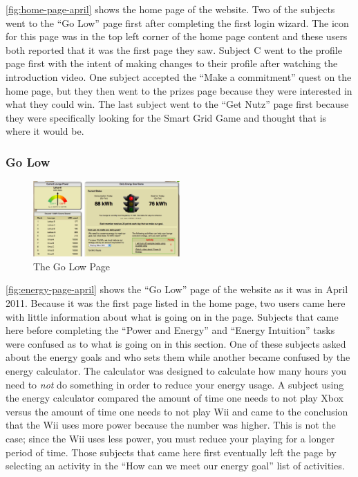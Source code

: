 \autoref{fig:home-page-april} shows the home page of the website. Two of the subjects went to the ``Go Low'' page first after completing the first login wizard. The icon for this page was in the top left corner of the home page content and these users both reported that it was the first page they saw. Subject C went to the profile page first with the intent of making changes to their profile after watching the introduction video. One subject accepted the ``Make a commitment'' quest on the home page, but they then went to the prizes page because they were interested in what they could win. The last subject went to the ``Get Nutz'' page first because they were specifically looking for the Smart Grid Game and thought that is where it would be.

\subsubsection{Go Low}

\begin{figure}[t]
    \center
    \includegraphics[width=0.5\textwidth]{images/energy-april.eps}
    \caption{The Go Low Page}
    \label{fig:energy-page-april}
\end{figure}

\autoref{fig:energy-page-april} shows the ``Go Low'' page of the website as it was in April 2011. Because it was the first page listed in the home page, two users came here with little information about what is going on in the page. Subjects that came here before completing the ``Power and Energy'' and ``Energy Intuition'' tasks were confused as to what is going on in this section. One of these subjects asked about the energy goals and who sets them while another became confused by the energy calculator. The calculator was designed to calculate how many hours you need to \emph{not} do something in order to reduce your energy usage. A subject using the energy calculator compared the amount of time one needs to not play Xbox versus the amount of time one needs to not play Wii and came to the conclusion that the Wii uses more power because the number was higher. This is not the case; since the Wii uses less power, you must reduce your playing for a longer period of time. Those subjects that came here first eventually left the page by selecting an activity in the ``How can we meet our energy goal'' list of activities.

